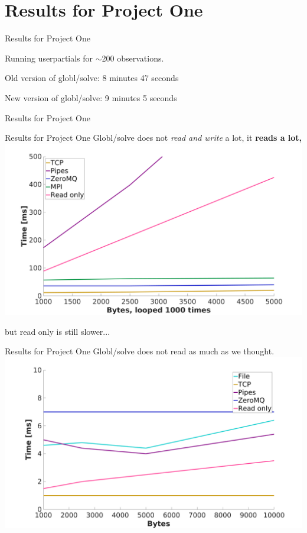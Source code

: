 \documentclass{beamer}
\begin{document}

    \section{Results for Project One}

    \begin{frame}{Results for Project One}
        \begin{description}[<+-|alert@+>]
            \item Running userpartials for $\sim$200 observations.
            \item Old version of globl/solve: 8 minutes 47 seconds
            \item New version of globl/solve: 9 minutes 5 seconds
        \end{description}
    \end{frame}
    \begin{frame}{Results for Project One}
    \end{frame}
    \begin{frame}{Results for Project One}
        Globl/solve does not \emph{read and write} a lot, it \bf{reads} a lot,
        \centering
        \includegraphics[width=1\columnwidth]{thousandrun}

        but read only is still slower...
    \end{frame}
    \begin{frame}{Results for Project One}
        Globl/solve does not read as much as we thought.
        \centering
        \includegraphics[width=1\columnwidth]{singlerun}
    \end{frame}
\end{document}
